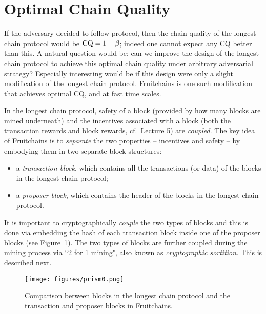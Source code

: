 \documentclass{article}
\begin{document}
\section*{Optimal Chain Quality}

If the adversary decided to follow protocol, then the chain quality of the longest chain protocol would be ${\rm CQ} = 1- \beta$; indeed one cannot expect any CQ better than this. A natural question would be: can we improve the design of the longest chain protocol to achieve this optimal chain quality under arbitrary adversarial strategy? Especially interesting would be if this design were only a slight modification of the longest chain protocol.  \href{https://eprint.iacr.org/2016/916.pdf}{Fruitchains} is one such modification that achieves optimal CQ, and at fast time scales.

In the longest chain protocol, safety of a block (provided by how many blocks are mined underneath) and  the incentives associated with a block (both the transaction rewards and block rewards, cf.\ Lecture 5) are {\em coupled}. The key idea of Fruitchains is to {\em separate} the two properties -- incentives and safety  -- by embodying them in two separate block structures:
\begin{itemize}
    \item  a {\em transaction block}, which contains all the transactions (or {\sf data}) of the blocks in the longest chain protocol; 
    \item a {\em proposer block}, which contains the header of the blocks in the longest chain protocol. 
\end{itemize}
It is  important to cryptographically {\em couple} the two types of blocks and this is done via 
embedding the hash of each transaction block inside one of the proposer blocks (see Figure~\ref{fig:fruitchains1}). 
The two types of blocks are further coupled during the mining process via ``2 for 1 mining", also known as {\em cryptographic sortition}. This is described next.

\begin{figure}
    \centering
    \texttt{[image: figures/prism0.png]}
    \caption{Comparison between blocks in the longest chain protocol and the transaction and proposer blocks in Fruitchains.}
    \label{fig:fruitchains1}
\end{figure}
\end{document}
